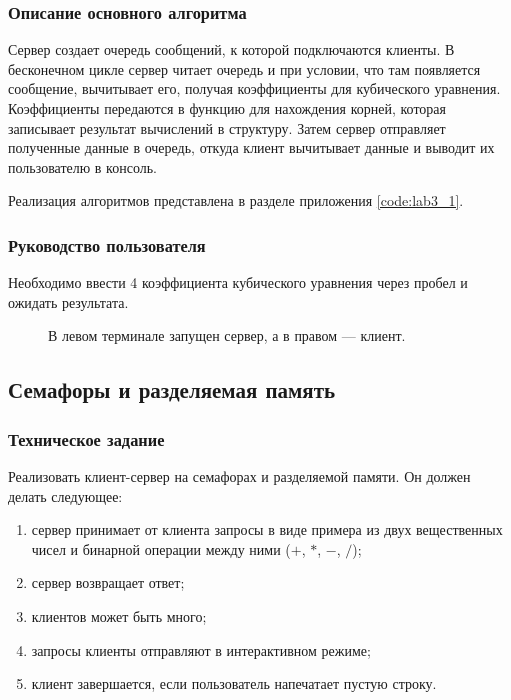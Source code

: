 \documentclass[a4paper,14pt]{extarticle}
\begin{document}
\subsubsection{Описание основного алгоритма}
Сервер создает очередь сообщений, к которой подключаются клиенты. В бесконечном цикле сервер читает очередь и при условии, что там появляется сообщение, вычитывает его, получая коэффициенты для кубического уравнения. Коэффициенты передаются в функцию для нахождения корней, которая записывает результат вычислений в структуру. Затем сервер отправляет полученные данные в очередь, откуда клиент вычитывает данные и выводит их пользователю в консоль.

Реализация алгоритмов представлена в разделе приложения \ref{code:lab3_1}.

\subsubsection{Руководство пользователя}
Необходимо ввести 4 коэффициента кубического уравнения через пробел и ожидать результата.

\begin{figure}[h]
\caption{В левом терминале запущен сервер, а в правом --- клиент.}
\label{1.png}
\end{figure}

\newpage

\subsection{Семафоры и разделяемая память}
\subsubsection{Техническое задание}
Реализовать клиент-сервер на семафорах и разделяемой памяти. Он должен делать следующее: 
\begin{enumerate}
	\item сервер принимает от клиента запросы в виде примера из двух вещественных чисел и бинарной операции между ними ($+$, $*$, $-$, $/$);
	\item сервер возвращает ответ;
	\item клиентов может быть много;
	\item запросы клиенты отправляют в интерактивном режиме;
	\item клиент завершается, если пользователь напечатает пустую строку.
\end{enumerate}
\end{document}
